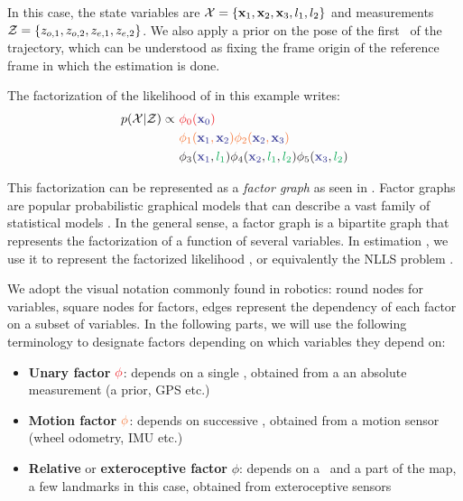 In this case, the state variables are $\mathcal{X} = \{ {\bf x}_1, {\bf x}_2, {\bf x}_3, l_1, l_2\}$  and measurements $\mathcal{Z} = \{ z_{o,1}, z_{o,2}, z_{e,1}, z_{e,2}\}$.
We also apply a prior on the pose of the first \keyframe\ of the trajectory, which can be understood as fixing the frame origin of the reference 
frame in which the estimation is done.

The factorization of the likelihood of  in this example writes:
%
\begin{align}
    p(\cX | \cZ) \propto 
    ~&{\color{Red} \phi_0({\color{Blue} \bfx_{0}})} \\ 
    ~&{\color{Orange} \phi_1({\color{Blue} \bfx_1}, {\color{Blue} \bfx_2}) \phi_2({\color{Blue} \bfx_2}, {\color{Blue} \bfx_3})} \\ 
    ~&{\color{Black} \phi_3({\color{Blue} \bfx_1}, {\color{Green} l_1}) \phi_4({\color{Blue} \bfx_2}, {\color{Green} l_1}, {\color{Green} l_2}) \phi_5({\color{Blue} \bfx_3}, {\color{Green} l_2})}
\end{align}

This factorization can be represented as a \textit{factor graph} as seen in . 
Factor graphs are popular probabilistic graphical models \cite{koller2009probabilistic} that can describe a vast family of statistical models \cite{loeliger2004introduction}.
In the general sense, a factor graph is a bipartite graph that represents the factorization of a function of several variables. In estimation , we use it to represent the factorized likelihood , or equivalently the NLLS problem .

We adopt the visual notation commonly found in robotics: round nodes for variables, square nodes for factors, edges represent the dependency 
of each factor on a subset of variables. In the following parts, we will use the following terminology to designate factors depending on which variables they depend on:

\begin{itemize}
    \item \textbf{Unary factor} $\color{Red} \phi$: depends on a single \keyframes, obtained from a an absolute measurement (\eg a prior, GPS etc.)
    \item \textbf{Motion factor} $\color{Orange} \phi$: depends on successive \keyframes, obtained from a motion sensor (\eg wheel odometry, IMU etc.)
    \item \textbf{Relative} or \textbf{exteroceptive factor} $\phi$: depends on a \keyframe\ and a part of the map, a few landmarks in this case, obtained from exteroceptive sensors
\end{itemize}

